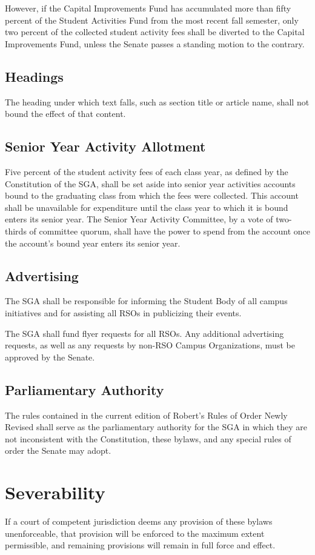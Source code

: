 \documentclass[12pt]{scrreprt}
\begin{document}
However, if the Capital Improvements Fund has accumulated more than fifty 
percent of the Student Activities Fund from the most recent fall semester, 
only two percent of the collected student activity fees shall be diverted to 
the Capital Improvements Fund, unless the Senate passes a standing motion to 
the contrary. 

\section{Headings}
The heading under which text falls, such as section title or article name, 
shall not bound the effect of that content. 

\section{Senior Year Activity Allotment}
Five percent of the student activity fees of each class year, as defined by 
the Constitution of the SGA, shall be set aside into senior year activities 
accounts bound to the graduating class from which the fees were collected. 
This account shall be unavailable for expenditure until the class year to 
which it is bound enters its senior year. The Senior Year Activity Committee, 
by a vote of two-thirds of committee quorum, shall have the power to spend 
from the account once the account's bound year enters its senior year. 

\section{Advertising}
The SGA shall be responsible for informing the Student Body of all campus 
initiatives and for assisting all RSOs in publicizing their events. 

The SGA shall fund flyer requests for all RSOs. Any additional advertising 
requests, as well as any requests by non-RSO Campus Organizations, must be 
approved by the Senate. 

\section{Parliamentary Authority} 
The rules contained in the current edition of Robert's Rules of Order Newly Revised shall serve
as the parliamentary authority for the SGA in which they are not inconsistent with the
Constitution, these bylaws, and any special rules of order the Senate may adopt.


\chapter{Severability}
If a court of competent jurisdiction deems any provision of these bylaws 
unenforceable, that provision will be enforced to the maximum extent 
permissible, and remaining provisions will remain in full force and effect. 
\end{document}
